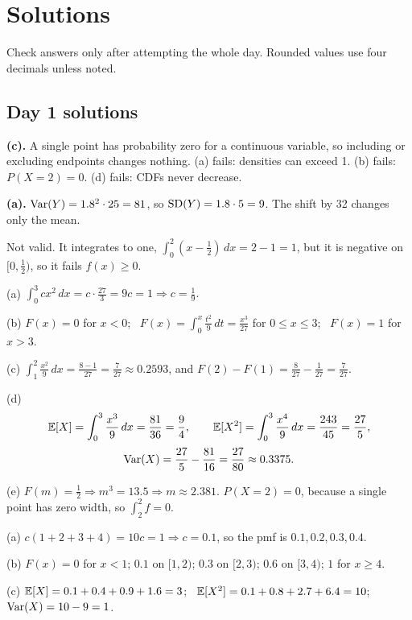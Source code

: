 \documentclass[11pt]{article}
\begin{document}
\clearpage
\section{Solutions}

\noindent Check answers only after attempting the whole day. Rounded values use four decimals unless noted.

\subsection{Day 1 solutions}

 \textbf{(c).} A single point has probability zero for a continuous variable, so including or excluding endpoints changes nothing. (a) fails: densities can exceed 1. (b) fails: $P(X=2)=0$. (d) fails: CDFs never decrease.

 \textbf{(a).} $\operatorname{Var}(Y)=1.8^2\cdot25=81$, so $\operatorname{SD}(Y)=1.8\cdot5=9$. The shift by 32 changes only the mean.

 Not valid. It integrates to one, $\int_0^2(x-\tfrac12)\,dx=2-1=1$, but it is negative on $[0,\tfrac12)$, so it fails $f(x)\ge0$.

(a) $\displaystyle\int_0^3 cx^2\,dx=c\cdot\frac{27}{3}=9c=1\Rightarrow c=\frac19.$

(b) $F(x)=0$ for $x<0$; \ $F(x)=\displaystyle\int_0^x\frac{t^2}{9}\,dt=\frac{x^3}{27}$ for $0\le x\le3$; \ $F(x)=1$ for $x>3$.

(c) $\displaystyle\int_1^2\frac{x^2}{9}\,dx=\frac{8-1}{27}=\frac{7}{27}\approx0.2593$, and $F(2)-F(1)=\frac{8}{27}-\frac1{27}=\frac7{27}$.

(d)
\[ \mathbb{E}[X]=\int_0^3\frac{x^3}{9}\,dx=\frac{81}{36}=\frac94, \qquad \mathbb{E}[X^2]=\int_0^3\frac{x^4}{9}\,dx=\frac{243}{45}=\frac{27}{5}, \]\[ \operatorname{Var}(X)=\frac{27}{5}-\frac{81}{16}=\frac{27}{80}\approx0.3375. \]

(e) $F(m)=\tfrac12\Rightarrow m^3=13.5\Rightarrow m\approx2.381$. $P(X=2)=0$, because a single point has zero width, so $\int_2^2 f=0$.

(a) $c(1+2+3+4)=10c=1\Rightarrow c=0.1$, so the pmf is $0.1,0.2,0.3,0.4$.

(b) $F(x)=0$ for $x<1$; $0.1$ on $[1,2)$; $0.3$ on $[2,3)$; $0.6$ on $[3,4)$; $1$ for $x\ge4$.

(c) $\mathbb{E}[X]=0.1+0.4+0.9+1.6=3$; \ $\mathbb{E}[X^2]=0.1+0.8+2.7+6.4=10$; \ $\operatorname{Var}(X)=10-9=1$.
\end{document}
